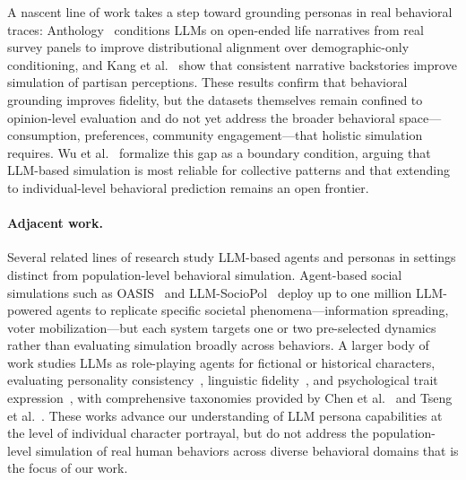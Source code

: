 %
A nascent line of work takes a step toward grounding personas in real behavioral traces: Anthology~\cite{anthology} conditions LLMs on open-ended life narratives from real survey panels to improve distributional alignment over demographic-only conditioning, and Kang et al.~\cite{deepbinding} show that consistent narrative backstories improve simulation of partisan perceptions.
These results confirm that behavioral grounding improves fidelity, but the datasets themselves remain confined to opinion-level evaluation and do not yet address the broader behavioral space---consumption, preferences, community engagement---that holistic simulation requires.
Wu et al.~\cite{wu_boundary_2025} formalize this gap as a boundary condition, arguing that LLM-based simulation is most reliable for collective patterns and that extending to individual-level behavioral prediction remains an open frontier.

\paragraph{Adjacent work.}
Several related lines of research study LLM-based agents and personas in settings distinct from population-level behavioral simulation.
Agent-based social simulations such as OASIS~\cite{oasis} and LLM-SocioPol~\cite{shirani_sociopol_2025} deploy up to one million LLM-powered agents to replicate specific societal phenomena---information spreading, voter mobilization---but each system targets one or two pre-selected dynamics rather than evaluating simulation broadly across behaviors.
A larger body of work studies LLMs as role-playing agents for fictional or historical characters, evaluating personality consistency~\cite{wang_incharacter_2024, zhou_characterbench_2024}, linguistic fidelity~\cite{du_twinvoice_2025, wang_rolellm_2024}, and psychological trait expression~\cite{serapio-garcia_personality_2025, wang_evaluating_2025, sorokovikova_llms_2024}, with comprehensive taxonomies provided by Chen et al.~\cite{chen_persona_2024} and Tseng et al.~\cite{tseng_two_2024}.
These works advance our understanding of LLM persona capabilities at the level of individual character portrayal, but do not address the population-level simulation of real human behaviors across diverse behavioral domains that is the focus of our work.
